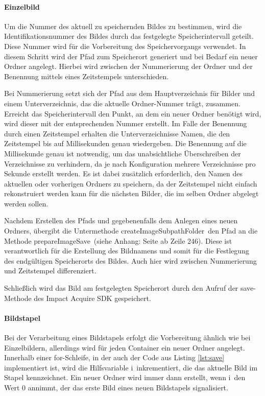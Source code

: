 \paragraph{Einzelbild}

Um die Nummer des aktuell zu speichernden Bildes zu bestimmen, wird die Identifikationsnummer des Bildes durch das festgelegte Speicherintervall geteilt. Diese Nummer 
wird für die Vorbereitung des Speichervorgangs verwendet. In diesem Schritt wird der Pfad zum Speicherort generiert und bei Bedarf ein neuer
Ordner angelegt. Hierbei wird zwischen der Nummerierung der Ordner und der Benennung mittels eines Zeitstempels unterschieden.

Bei Nummerierung setzt sich der Pfad aus dem Hauptverzeichnis für Bilder und einem Unterverzeichnis, das die aktuelle Ordner-Nummer trägt, zusammen. Erreicht das Speicherintervall 
den Punkt, an dem ein neuer Ordner benötigt wird, wird dieser mit der entsprechenden Nummer erstellt. Im Falle der Benennung durch einen Zeitstempel erhalten die Unterverzeichnisse 
Namen, die den Zeitstempel bis auf Millisekunden genau wiedergeben. Die Benennung auf die Millisekunde genau ist notwendig, um das unabsichtliche Überschreiben der Verzeichnisse zu verhindern, da je nach Konfiguration 
mehrere Verzeichnisse pro Sekunde erstellt werden. Es ist dabei zusätzlich erforderlich, den Namen des aktuellen oder vorherigen Ordners zu speichern, da der Zeitstempel nicht 
einfach rekonstruiert werden kann für die nächsten Bilder, die im selben Ordner abgelegt werden sollen.

Nachdem Erstellen des Pfads und gegebenenfalls dem Anlegen eines neuen Ordners, übergibt die Untermethode \glqq createImageSubpathFolder\grqq\ den Pfad an die Methode \glqq prepareImageSave\grqq\ (siehe Anhang: Seite \pageref{ImageSavePreparer2} ab Zeile 246). 
Diese ist verantwortlich für die Erstellung des Bildnamens und somit für die Festlegung des endgültigen Speicherorts des Bildes. Auch hier wird zwischen Nummerierung und Zeitstempel 
differenziert.

Schließlich wird das Bild am festgelegten Speicherort durch den Aufruf der \glqq save\grqq-Methode des Impact Acquire SDK gespeichert.

\paragraph{Bildstapel}

Bei der Verarbeitung eines Bildstapels erfolgt die Vorbereitung ähnlich wie bei Einzelbildern, allerdings wird für jeden Container ein neuer Ordner angelegt. Innerhalb einer 
for-Schleife, in der auch der Code aus Listing \ref{lst:save} implementiert ist, wird die Hilfsvariable \glqq i\grqq\ inkrementiert, die das aktuelle Bild im Stapel kennzeichnet. 
Ein neuer Ordner wird immer dann erstellt, wenn \glqq i\grqq\ den Wert 0 annimmt, der das erste Bild eines neuen Bildstapels signalisiert.

